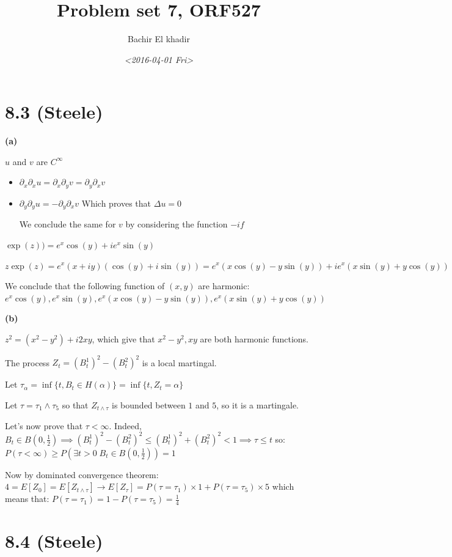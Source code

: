 \documentclass[11pt]{article}
\author{Bachir El khadir}
\date{\textit{<2016-04-01 Fri>}}
\title{Problem set 7, ORF527}
\begin{document}
\maketitle

\section{8.3 (Steele)}
\label{sec:orgheadline1}
\textbf{(a)}

\(u\) and \(v\) are \(C^{\infty}\)

\begin{itemize}
\item \(\partial_x \partial_x u = \partial_x \partial_y v = \partial_y \partial_x v\)
\item \(\partial_y \partial_y u = -\partial_y \partial_x v\)
Which proves that \(\Delta u = 0\)  

We conclude the same for \(v\) by considering the function \(-if\)
\end{itemize}

\(\exp(z)) = e^x\cos(y) + ie^x\sin(y)\)

\(z\exp(z) = e^x(x+iy)(\cos(y)+i\sin(y)) = e^x(x\cos(y) - y\sin(y)) + ie^x(x\sin(y)+y\cos(y))\)

We conclude that the following function of \((x,y)\) are harmonic:
\(e^x\cos(y), e^x\sin(y), e^x(x\cos(y) - y\sin(y)), e^x(x\sin(y)+y\cos(y))\)

\textbf{(b)}

\(z^2 = (x^2 - y^2) + i 2xy\), which give that \(x^2 - y^2, xy\) are both harmonic functions.

The process \(Z_t = (B^1_t)^2 - (B^2_t)^2\) is a local martingal.

Let \(\tau_{\alpha} = \inf\{t, B_t \in H(\alpha) \} = \inf\{t, Z_t = \alpha \}\)

Let \(\tau = \tau_1 \wedge \tau_5\) so that \(Z_{t \wedge \tau}\) is bounded between \(1\) and \(5\), so it is a martingale.

Let's now prove that \(\tau < \infty\). Indeed,
\(B_t \in B(0, \frac12) \implies (B_t^1)^2-(B_t^2)^2 \le (B_t^1)^2+(B_t^2)^2 < 1 \implies \tau \le t\)
so:
\(P(\tau < \infty) \ge P( \exists t > 0 \; B_t \in B(0, \frac12)) = 1\)

Now by dominated convergence theorem: \(4 = E[Z_0] = E[Z_{t \wedge \tau}] \rightarrow E[Z_{\tau}] = P(\tau = \tau_1)\times 1+ P(\tau = \tau_5)\times 5\)
which means that: \(P(\tau = \tau_1) = 1 - P(\tau  = \tau_5) = \frac14\)

\section{8.4 (Steele)}
\label{sec:orgheadline2}
\end{document}

